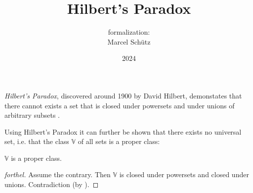 \documentclass{article}
\title{Hilbert's Paradox}
\author{\Naproche formalization:\\[0.5em]Marcel Schütz}
\date{2024}
\newcommand\V{\mathbb V}
\begin{document}
  \maketitle


  \noindent \emph{Hilbert's Paradox}, discovered around 1900 by David Hilbert, 
  demonstates that there cannot exists a set that is closed under powersets and 
  under unions of arbitrary subsets \cite{PeckhausKahl2002}.


  \noindent Using Hilbert's Paradox it can further be shown that there exists 
  no universal set, i.e. that the class $\V$ of all sets is a proper class:

  \begin{corollary*}[forthel,id=hilbert_paradox_corollary]
    $\V$ is a proper class.
  \end{corollary*}
  \begin{proof}[forthel]
    Assume the contrary.
    Then $\V$ is closed under powersets and closed under unions.
    Contradiction (by ).
  \end{proof}

  \printbibliography
\end{document}
